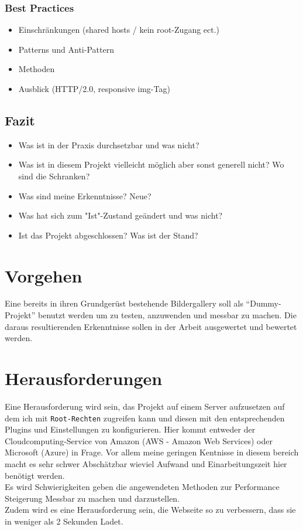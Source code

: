 \documentclass[a4paper,11pt,singlespacing]{article}
\begin{document}
		\subsubsection{Best Practices} %
		\label{ssub:best_practices}
			\begin{itemize}
				\item Einschränkungen (shared hosts / kein root-Zugang ect.)
				\item Patterns und Anti-Pattern
				\item Methoden
				\item Ausblick (HTTP/2.0, responsive img-Tag)
			\end{itemize}

	\subsection{Fazit} %
	\label{sub:fazit}
		\begin{itemize}
			\item Was ist in der Praxis durchsetzbar und was nicht?
			\item Was ist in diesem Projekt vielleicht möglich aber sonst generell nicht? Wo sind die Schranken? 
			\item Was sind meine Erkenntnisse? Neue?
			\item Was hat sich zum "Ist"-Zustand geändert und was nicht?
			\item Ist das Projekt abgeschlossen? Was ist der Stand?
		\end{itemize}

\section{Vorgehen} %
\label{sec:vorgehen}
	Eine bereits in ihren Grundgerüst bestehende Bildergallery soll als "`Dummy-Projekt"' benutzt werden um zu testen, anzuwenden und messbar zu machen. Die daraus resultierenden Erkenntnisse sollen in der Arbeit ausgewertet und bewertet werden. 

\section{Herausforderungen} %
\label{sec:herausforderungen}
	Eine Herausforderung wird sein, das Projekt auf einem Server aufzusetzen auf dem ich mit \texttt{Root-Rechten} zugreifen kann und diesen mit den entsprechenden Plugins und Einstellungen zu konfigurieren. Hier kommt entweder der Cloudcomputing-Service von Amazon (AWS - Amazon Web Services) oder Microsoft (Azure) in Frage. Vor allem meine geringen Kentnisse in diesem bereich macht es sehr schwer Abschätzbar wieviel Aufwand und Einarbeitungszeit hier benötigt werden.\\
	Es wird Schwierigkeiten geben die angewendeten Methoden zur Performance Steigerung Messbar zu machen und darzustellen. \\
	Zudem wird es eine Herausforderung sein, die Webseite so zu verbessern, dass sie in weniger als 2 Sekunden Ladet. 
\end{document}
